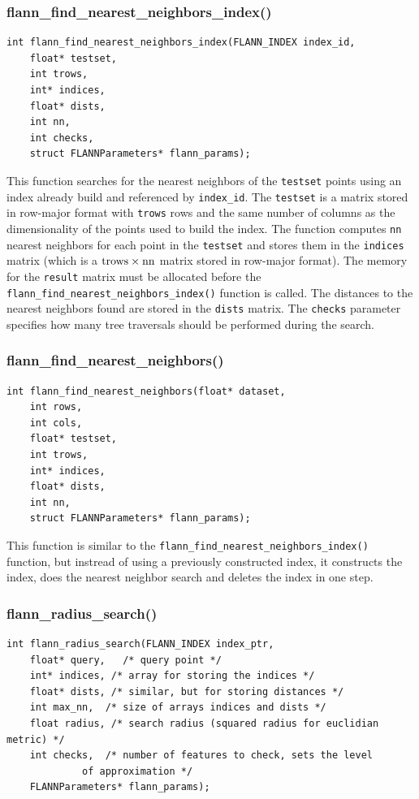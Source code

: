 \documentclass[letter,10pt]{article}
\begin{document}
\subsubsection{flann\_find\_nearest\_neighbors\_index()}
\begin{Verbatim}[fontsize=\footnotesize,frame=single]
int flann_find_nearest_neighbors_index(FLANN_INDEX index_id,
	float* testset,
	int trows,
	int* indices,
	float* dists,
	int nn,
	int checks,
	struct FLANNParameters* flann_params);
\end{Verbatim}
This function searches for the nearest neighbors of the
\texttt{testset} points using an index already build and referenced by
\texttt{index\_id}. The \texttt{testset} is a matrix stored in row-major format
with \texttt{trows} rows and the same number of columns as the dimensionality
of the points used to build the index. The function computes \texttt{nn}
nearest neighbors for each point in the \texttt{testset} and stores them in the
\texttt{indices} matrix (which is a $\rm{trows} \times \rm{nn}$ matrix stored in
row-major format). The memory for the \texttt{result} matrix must be allocated
before the \texttt{flann\_find\_nearest\_neighbors\_index()} function is
called. The distances to the nearest neighbors found are stored in the \texttt{dists}
matrix. The \texttt{checks} parameter specifies how many tree traversals should
be performed during the search.



\subsubsection{flann\_find\_nearest\_neighbors()}
\begin{Verbatim}[fontsize=\footnotesize,frame=single]
int flann_find_nearest_neighbors(float* dataset,
	int rows,
	int cols,
	float* testset,
	int trows,
	int* indices,
	float* dists,
	int nn,
	struct FLANNParameters* flann_params);
\end{Verbatim}
This function is similar to the
\texttt{flann\_find\_nearest\_neighbors\_index()} function, but instread of
using a previously constructed index, it constructs the index, does the nearest
neighbor search and deletes the index in one step.

\subsubsection{flann\_radius\_search()}

\begin{Verbatim}[fontsize=\footnotesize,frame=single]
int flann_radius_search(FLANN_INDEX index_ptr,
	float* query,   /* query point */
	int* indices, /* array for storing the indices */
	float* dists, /* similar, but for storing distances */
	int max_nn,  /* size of arrays indices and dists */
	float radius, /* search radius (squared radius for euclidian metric) */
	int checks,  /* number of features to check, sets the level
			 of approximation */
	FLANNParameters* flann_params);
\end{Verbatim}
\end{document}
